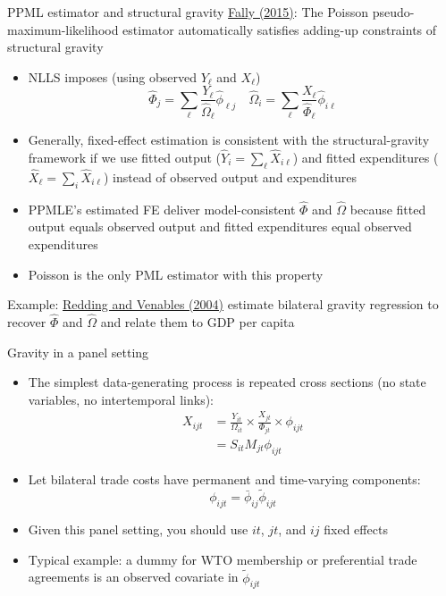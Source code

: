 \documentclass[10pt,notes=hide,aspectratio=169]{beamer}
\begin{document}
\begin{frame}{PPML estimator and structural gravity}
\href{https://doi.org/10.1016/j.jinteco.2015.05.005}{Fally (2015)}:
The Poisson pseudo-maximum-likelihood estimator automatically satisfies adding-up constraints of structural gravity
\begin{itemize}
\item 
NLLS imposes (using observed $Y_{\ell}$ and $X_{\ell}$)
\begin{equation*}
\hat{\Phi}_j = \sum_{\ell} \frac{Y_{\ell}}{\hat{\Omega}_{\ell}} \hat{\phi}_{\ell j}
\quad
\hat{\Omega}_i = \sum_{\ell} \frac{X_{\ell}}{\hat{\Phi}_{\ell}} \hat{\phi}_{i \ell}
\end{equation*}
\item 
Generally, fixed-effect estimation is consistent with the structural-gravity framework
if we use fitted output ($\hat{Y}_{i} = \sum_{\ell} \hat{X}_{i\ell}$) and fitted expenditures ($\hat{X}_{\ell} = \sum_{i} \hat{X}_{i\ell}$)
instead of observed output and expenditures
\item 
PPMLE's estimated FE deliver model-consistent $\hat{\Phi}$ and $\hat{\Omega}$ because
fitted output equals observed output and fitted expenditures equal observed expenditures
\item
Poisson is the only PML estimator with this property
\end{itemize}
Example:
\href{https://ideas.repec.org/a/eee/inecon/v62y2004i1p53-82.html}{Redding and Venables (2004)}
estimate bilateral gravity regression to recover $\hat{\Phi}$ and $\hat{\Omega}$
and relate them to GDP per capita
\end{frame}
\begin{frame}{Gravity in a panel setting}
\begin{itemize}
\item The simplest data-generating process is repeated cross sections
(no state variables, no intertemporal links):
\begin{align*}
X_{ijt} 
&=
\frac{Y_{it}}{\Omega_{it}} \times \frac{X_{jt}}{\Phi_{jt}} \times \phi_{ijt}
\\
&=
S_{it} M_{jt} \phi_{ijt}
\end{align*}
\item Let bilateral trade costs have permanent and time-varying components:
$$
\phi_{ijt} = \bar{\phi}_{ij} \tilde{\phi}_{ijt}
$$
\item Given this panel setting, you should use $it$, $jt$, and $ij$ fixed effects
\item Typical example: a dummy for WTO membership or preferential trade agreements is an observed covariate in $\tilde{\phi}_{ijt}$
\end{itemize}
\end{frame}
\end{document}

